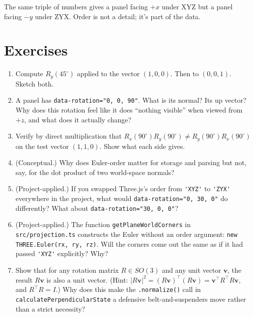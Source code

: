 \documentclass{article}
\begin{document}
The same triple of numbers gives a panel facing $+x$ under XYZ but a panel
facing $-y$ under ZYX. Order is not a detail; it's part of the data.

\section{Exercises}

\begin{enumerate}
\item Compute $R_y(45^\circ)$ applied to the vector $(1,0,0)$. Then to $(0,0,1)$. Sketch both.

\item A panel has \lstinline|data-rotation="0, 0, 90"|. What is its normal?
Its up vector? Why does this rotation feel like it does ``nothing visible''
when viewed from $+z$, and what does it actually change?

\item Verify by direct multiplication that
$R_x(90^\circ)R_y(90^\circ) \neq R_y(90^\circ)R_x(90^\circ)$ on the test
vector $(1,1,0)$. Show what each side gives.

\item (Conceptual.) Why does Euler-order matter for storage and parsing
but not, say, for the dot product of two world-space normals?

\item (Project-applied.) If you swapped Three.js's order from
\lstinline|'XYZ'| to \lstinline|'ZYX'| everywhere in the project, what
would \lstinline|data-rotation="0, 30, 0"| do differently? What about
\lstinline|data-rotation="30, 0, 0"|?

\item (Project-applied.) The function
\lstinline|getPlaneWorldCorners| in
\texttt{src/projection.ts} constructs the Euler without an order argument:
\lstinline|new THREE.Euler(rx, ry, rz)|. Will the corners come out the same
as if it had passed \lstinline|'XYZ'| explicitly? Why?

\item Show that for any rotation matrix $R \in SO(3)$ and any unit vector
$\mathbf{v}$, the result $R\mathbf{v}$ is also a unit vector. (Hint:
$|R\mathbf{v}|^2 = (R\mathbf{v})^\top(R\mathbf{v}) = \mathbf{v}^\top R^\top R \mathbf{v}$,
and $R^\top R = I$.) Why does this make the
\lstinline|.normalize()| call in \lstinline|calculatePerpendicularState| a
defensive belt-and-suspenders move rather than a strict necessity?
\end{enumerate}
\end{document}
